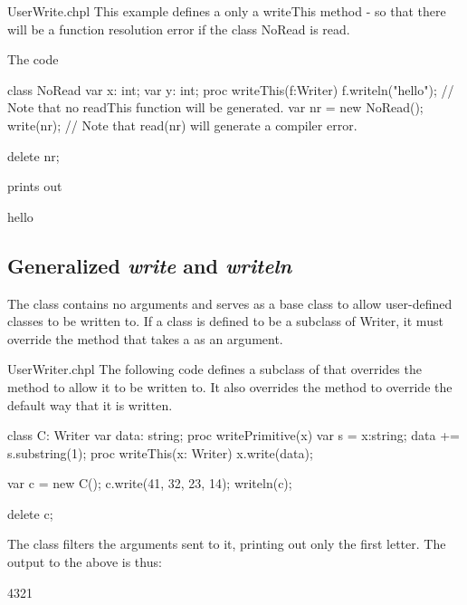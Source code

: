 \begin{chapelexample}{UserWrite.chpl}
This example defines a only a writeThis method - so that there will be a function resolution error if the class NoRead is read.

The code
\begin{chapel}
class NoRead {
  var x: int;
  var y: int;
  proc writeThis(f:Writer) {
    f.writeln("hello");
  }
  // Note that no readThis function will be generated.
}
var nr = new NoRead();
write(nr);
// Note that read(nr) will generate a compiler error.
\end{chapel}
\begin{chapelpost}
delete nr;
\end{chapelpost}
prints out
\begin{chapelprintoutput}{}
hello
\end{chapelprintoutput}
\end{chapelexample}


\subsection{Generalized {\em write} and {\em writeln}}
\label{writer}

The  class contains no arguments and serves as a base
class to allow user-defined classes to be written to.  If a class is
defined to be a subclass of Writer, it must override
the  method that takes a  as an argument.

\begin{chapelexample}{UserWriter.chpl}
The following code defines a subclass of  that overrides
the  method to allow it to be written to.  It also
overrides the  method to override the default way that
it is written.
\begin{chapel}
class C: Writer {
  var data: string;
  proc writePrimitive(x) {
    var s = x:string;
    data += s.substring(1);
  }
  proc writeThis(x: Writer) {
    x.write(data);
  }
}

var c = new C();
c.write(41, 32, 23, 14);
writeln(c);
\end{chapel}
\begin{chapelpost}
delete c;
\end{chapelpost}
The  class filters the arguments sent to it, printing out only
the first letter.  The output to the above is thus:
\begin{chapelprintoutput}{}
4321
\end{chapelprintoutput}
\end{chapelexample}


